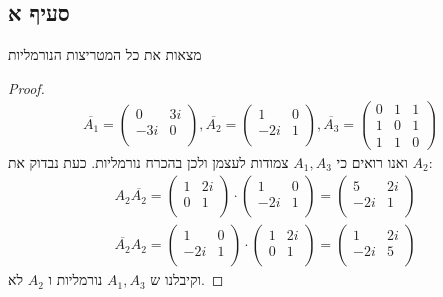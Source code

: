 \documentclass{article}
\begin{document}
	\subsection*{סעיף א}
	מצאות את כל המטריצות הנורמליות
	\begin{proof}
		\begin{align*}
			\overline{A_1} = \begin{pmatrix}
				0 & 3i \\
				-3i & 0 \\
			\end{pmatrix},
			\overline{A_2} = \begin{pmatrix}
				1 & 0 \\
				-2i & 1 \\
			\end{pmatrix},
			\overline{A_3} = \begin{pmatrix}
				0 & 1 & 1 \\
				1 & 0 & 1 \\
				1 & 1 & 0
				\end{pmatrix}
		\end{align*}
		ואנו רואים כי $A_1, A_3$ צמודות לעצמן ולכן בהכרח נורמליות. כעת נבדוק את $A_2$:
		\begin{align*}
			&A_2\overline{A_2} =
			\begin{pmatrix}
				1 & 2i \\
				0 & 1 \\
			\end{pmatrix} \cdot
			\begin{pmatrix}
				1 & 0 \\
				-2i & 1 \\
			\end{pmatrix} =
			\begin{pmatrix}
				5 & 2i \\
				-2i & 1 \\
			\end{pmatrix} \\
			&\overline{A_2}A_2 =
			\begin{pmatrix}
				1 & 0 \\
				-2i & 1 \\
			\end{pmatrix} \cdot
			\begin{pmatrix}
				1 & 2i \\
				0 & 1 \\
			\end{pmatrix} =
			\begin{pmatrix}
				1 & 2i \\
				-2i & 5 \\
			\end{pmatrix}
		\end{align*}
		וקיבלנו ש $A_1, A_3$ נורמליות ו $A_2$ לא.
	\end{proof}
\end{document}
